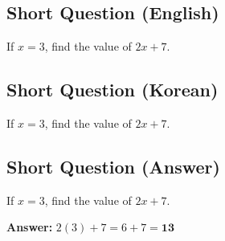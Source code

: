 \cleardoublepage
\subsection*{Short Question (English)}
If $x = 3$, find the value of $2x + 7$.


\newpage
\subsection*{Short Question (Korean)}
If $x = 3$, find the value of $2x + 7$.


\newpage
\subsection*{Short Question (Answer)}
If $x = 3$, find the value of $2x + 7$.

\textbf{Answer:} $2(3) + 7 = 6 + 7 = \mathbf{13}$

